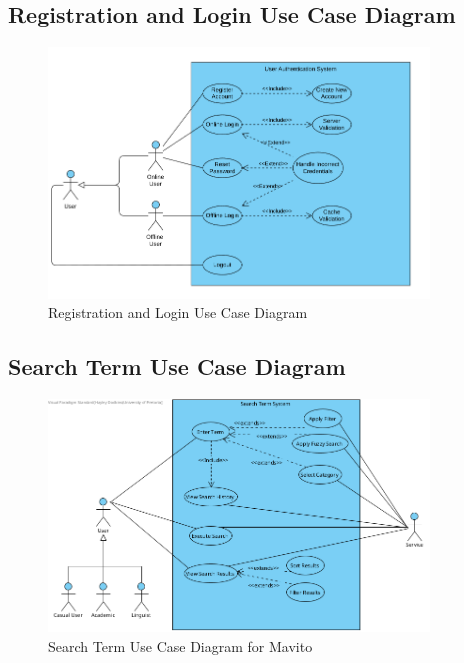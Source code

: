 \documentclass[12pt]{article}
\begin{document}
\subsection{Registration and Login Use Case Diagram}
\begin{figure}[H]
  \centering
  \includegraphics[width=0.9\textwidth]{registration_login.png}
  \caption{Registration and Login Use Case Diagram}
  \label{fig:reg-log-use-case}
\end{figure}

\subsection{Search Term Use Case Diagram}
\begin{figure}[H]
  \centering
  \includegraphics[width=0.9\textwidth]{SearchTermUseCase.png}
  \caption{Search Term Use Case Diagram for Mavito}
  \label{fig:search-use-case}
\end{figure}
\end{document}
